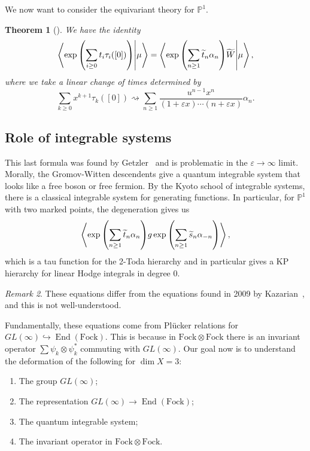 \documentclass[leqno, openany]{memoir}
\newtheorem{thm}{Theorem}[section]
\theoremstyle{definition}
\theoremstyle{remark}
\newtheorem{rmk}[thm]{Remark}
\theoremstyle{plain}
\theoremstyle{definition}
\theoremstyle{remark}
\renewcommand{\P}{\mathbb{P}}
\newcommand{\ep}{\varepsilon}
\newcommand{\mr}[1]{\mathrm{#1}}
\newcommand{\wt}[1]{\widetilde{#1}}
\DeclareMathOperator{\End}{End}
\begin{document}
We now want to consider the equivariant theory for $\P^1$.
\begin{thm}[\cite{op2}]\label{thm:op02}
    We have the identity
    \[ \braket{\exp\qty(\sum_{i \geq 0} t_i \tau_i([0]))}{\mu} = \braket{\exp\qty(\sum_{n \geq 1} \wt{t}_n \alpha_n) \wt{W}}{\mu}, \]
    where we take a linear change of times determined by
    \[ \sum_{k \geq 0} x^{k+1} \tau_k([0]) \rightsquigarrow \sum_{n \geq 1} \frac{u^{n-1}x^n}{(1+\ep x) \cdots (n+\ep x)} \alpha_n. \]
\end{thm}

\subsection{Role of integrable systems}

This last formula was found by Getzler~\cite{getz} and is problematic in the $\ep \to \infty$ limit. Morally, the Gromov-Witten descendents give a quantum integrable system that looks like a free boson or free fermion. By the Kyoto school of integrable systems, there is a classical integrable system for generating functions. In particular, for $\P^1$ with two marked points, the degeneration gives us
\[ \ev{\exp \qty(\sum_{n \geq 1} \wt{t}_n \alpha_n) g \exp\qty(\sum_{n \geq 1} \wt{s}_n \alpha_{-n})}, \]
which is a tau function for the 2-Toda hierarchy and in particular gives a KP hierarchy for linear Hodge integrals in degree $0$.

\begin{rmk}
    These equations differ from the equations found in 2009 by Kazarian~\cite{kaz}, and this is not well-understood.
\end{rmk}

Fundamentally, these equations come from Pl\"ucker relations for $GL(\infty) \hookrightarrow \End(\mr{Fock})$. This is because in $\mr{Fock} \otimes \mr{Fock}$ there is an invariant operator $\sum \psi_k \otimes \psi_k^*$ commuting with $GL(\infty)$. Our goal now is to understand the deformation of the following for $\dim X = 3$:
\begin{enumerate}
    \item The group $GL(\infty)$;
    \item The representation $GL(\infty) \to \End(\mr{Fock})$;
    \item The quantum integrable system;
    \item The invariant operator in $\mr{Fock} \otimes \mr{Fock}$.
\end{enumerate}
\end{document}
